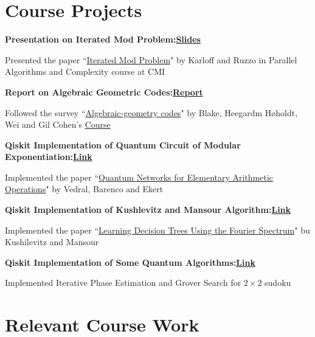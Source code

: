 \documentclass[letterpaper,10pt]{article}
\newenvironment{resume_list}{
  \vspace{-7pt}
  \begin{itemize}[itemsep=-2px, parsep=1pt, leftmargin=30pt, label={$\circ$}]
}{
  \end{itemize}
}
\begin{document}
\section{Course Projects}
\begin{resume_list}
	\item \textbf{Presentation on Iterated Mod Problem:\hfill \href{https://sohamch08.github.io/assets/parallel-presentation-iterated-mod.pdf}{Slides}}
	
	Presented the paper ``\href{https://www.sciencedirect.com/science/article/pii/0890540189900084}{Iterated Mod Problem}" by Karloff and Ruzzo in Parallel Algorithms and Complexity course at CMI
	\item \textbf{Report on Algebraic Geometric Codes:\hfill \href{https://sohamch08.github.io/assets/act-report.pdf}{Report}}
	
	Followed the survey ``\href{https://dl.acm.org/doi/abs/10.5555/334156.334207}{Algebraic-geometry codes}" by Blake, Heegardm H\o{}holdt, Wei and Gil Cohen's \href{https://www.gilcohen.org/2022-ag-codes}{Course}
	\item \textbf{Qiskit Implementation of Quantum Circuit of Modular Exponentiation:\hfill \href{https://github.com/bluecheese123/-Best_Project-}{Link}}
	
	Implemented the paper ``\href{https://arxiv.org/pdf/quant-ph/9511018.pdf}{Quantum Networks for Elementary Arithmetic Operations}" by Vedral, Barenco and Ekert
	\item \textbf{Qiskit Implementation of Kushlevitz and Mansour Algorithm:\hfill \href{https://github.com/sohamch08/Qiskit-Quantum-Algo/blob/master/Kushlevitz and Mansour Algorithm.ipynb}{Link}}
	
	Implemented the paper ``\href{https://dl.acm.org/doi/pdf/10.1145/103418.103466}{Learning Decision Trees Using the Fourier Spectrum}" bu Kushilevitz and Mansour
	\item \textbf{Qiskit Implementation of Some Quantum Algorithms:\hfill \href{https://github.com/sohamch08/Qiskit-Quantum-Algo}{Link}}
	
	Implemented Iterative Phase Estimation and Grover Search for $2\times 2$ sudoku
\end{resume_list}

\section{Relevant Course Work}
\end{document}
